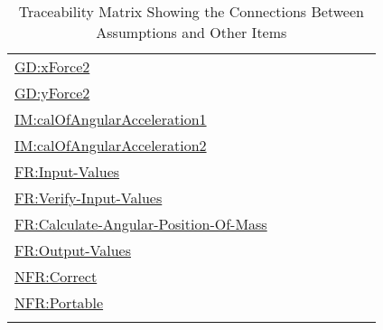 \documentclass[12pt]{article}
\begin{document}
\begin{longtable}{l l l l l l l l}
\hyperref[GD:xForce2]{GD:xForce2} &  &  &  &  &  &  & 
\\
\hyperref[GD:yForce2]{GD:yForce2} &  &  &  &  &  &  & 
\\
\hyperref[IM:calOfAngularAcceleration1]{IM:calOfAngularAcceleration1} &  &  &  &  &  &  & 
\\
\hyperref[IM:calOfAngularAcceleration2]{IM:calOfAngularAcceleration2} &  &  &  &  &  &  & 
\\
\hyperref[inputValues]{FR:Input-Values} &  &  &  &  &  &  & 
\\
\hyperref[verifyInptVals]{FR:Verify-Input-Values} &  &  &  &  &  &  & 
\\
\hyperref[calcAngPos]{FR:Calculate-Angular-Position-Of-Mass} &  &  &  &  &  &  & 
\\
\hyperref[outputValues]{FR:Output-Values} &  &  &  &  &  &  & 
\\
\hyperref[correct]{NFR:Correct} &  &  &  &  &  &  & 
\\
\hyperref[portable]{NFR:Portable} &  &  &  &  &  &  & 
\\
\bottomrule
\caption{Traceability Matrix Showing the Connections Between Assumptions and Other Items}
\label{Table:TraceMatAvsAll}
\end{longtable}
\end{document}
